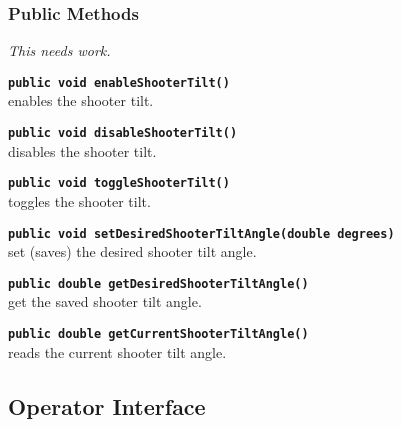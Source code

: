 \documentclass[]{article}
\begin{document}
\subsubsection{Public Methods}

\emph{This needs work.}

\noindent \texttt{\textbf{public void enableShooterTilt()}} \\
enables the shooter tilt.

\noindent \texttt{\textbf{public void disableShooterTilt()}} \\
disables the shooter tilt.

\noindent \texttt{\textbf{public void toggleShooterTilt()}} \\
toggles the shooter tilt.

\noindent \texttt{\textbf{public void setDesiredShooterTiltAngle(double degrees)}} \\
set (saves) the desired shooter tilt angle.

\noindent \texttt{\textbf{public double getDesiredShooterTiltAngle()}} \\
get the saved shooter tilt angle.

\noindent \texttt{\textbf{public double getCurrentShooterTiltAngle()}} \\
reads the current shooter tilt angle.


\subsection{Operator Interface}
\end{document}

